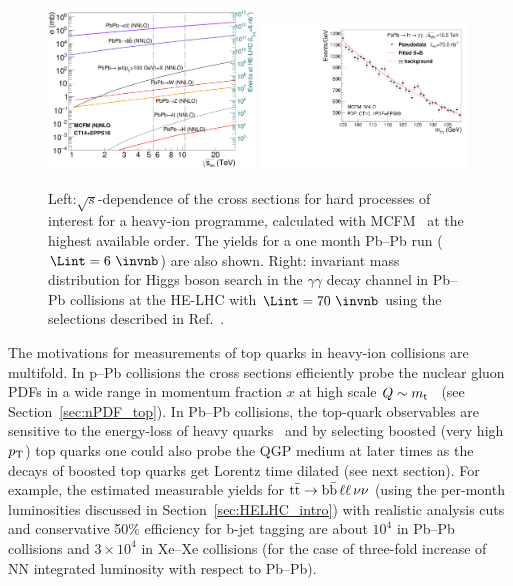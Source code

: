 \documentclass[../report.tex]{subfiles}
\begin{document}
\begin{figure}[!h]
\begin{center}
\includegraphics[width=0.49\textwidth]{helhc/figs/sigma_PbPb_pQCD_vs_sqrts.pdf}
\hfill
\includegraphics[width=0.49\textwidth]{helhc/figs/dsigmadm_Hgg_SplusB_PbPb_10500GeV_lumi70_0invpb.pdf}
\caption{Left:$\sqrt s$-dependence of the cross sections for hard processes of
  interest for a heavy-ion programme, calculated with MCFM~\cite{Campbell:2010ff}
at the highest available order. The yields for a one month Pb--Pb run ($\Lint=6~\invnb$) are also shown.
  Right: invariant mass distribution for Higgs boson search in the $\gamma\gamma$ decay channel in Pb--Pb collisions at the HE-LHC with $\Lint=70~\invnb$ using the selections described in Ref.~\cite{dEnterria:2017jyt}.}
\label{fig:hardXsectHIC}
\end{center}
\end{figure}





The motivations for measurements of top quarks in heavy-ion collisions
are multifold. 
In p--Pb collisions the cross sections efficiently probe the nuclear
gluon PDFs in a wide range in momentum fraction
$x$ at high scale $Q\sim m_{\rm t}$~\cite{dEnterria:2015mgr} (see Section~\ref{sec:nPDF_top}). In Pb--Pb collisions, the top-quark observables are sensitive to the energy-loss of heavy quarks~\cite{Baskakov:2015nxa}
and by selecting boosted (very high $p_{\rm T}$) top quarks one could also probe the QGP medium at later times as the decays of boosted top quarks get Lorentz
time dilated (see next section). 
For example, the estimated measurable yields  for $\rm t\bar t\to b\bar b\,\ell\ell\,\nu\nu$ (using the
 per-month luminosities discussed in Section~\ref{sec:HELHC_intro}) with
realistic analysis cuts 
and conservative 50\% efficiency for b-jet tagging are
about $10^4$ in Pb--Pb collisions and $3\times 10^4$ in Xe--Xe collisions (for the case of three-fold increase of NN integrated luminosity with respect to Pb--Pb).
\end{document}
